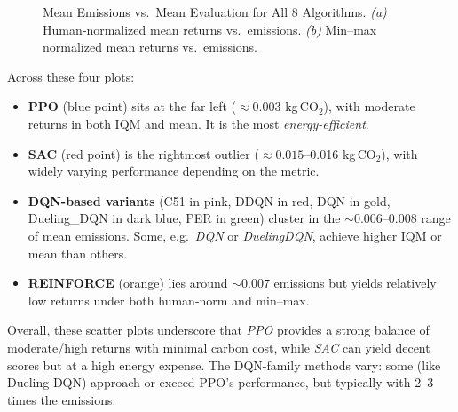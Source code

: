 \begin{figure} 
	\centering
	\quad
	\caption{Mean Emissions vs.\ Mean Evaluation for All 8 Algorithms.
		\textit{(a)} Human‐normalized mean returns vs.\ emissions. 
		\textit{(b)} Min--max normalized mean returns vs.\ emissions.}
	\label{fig:scatter_all_mean}
\end{figure}

Across these four plots:
\begin{itemize}
	\item \textbf{PPO} (blue point) sits at the far left (\(\approx 0.003\) kg\,CO$_2$), 
	with moderate returns in both IQM and mean. It is the most \emph{energy-efficient}.
	\item \textbf{SAC} (red point) is the rightmost outlier (\(\approx 0.015\)–0.016 kg\,CO$_2$), 
	with widely varying performance depending on the metric. 
	\item \textbf{DQN-based variants} (C51 in pink, DDQN in red, DQN in gold,
	Dueling\_DQN in dark blue, PER in green) cluster in the \(\sim0.006\)--0.008 range
	of mean emissions. Some, e.g.\ \emph{DQN} or \emph{DuelingDQN}, achieve higher 
	IQM or mean than others.
	\item \textbf{REINFORCE} (orange) lies around \(\sim0.007\) emissions but yields 
	relatively low returns under both human‐norm and min–max.
\end{itemize}
Overall, these scatter plots underscore that \textit{PPO} provides a strong balance of 
moderate/high returns with minimal carbon cost, while \textit{SAC} can yield decent 
scores but at a high energy expense. The DQN-family methods vary: some (like 
Dueling DQN) approach or exceed PPO's performance, but typically with 2--3 times the emissions.

